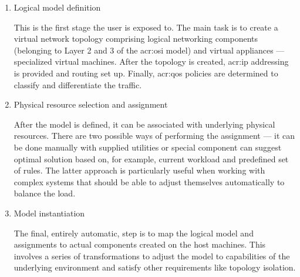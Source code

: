 \documentclass[11pt,openany]{book}
\begin{document}
          \begin{enumerate}

            \item Logical model definition

              This is the first stage the user is exposed to. The main task is to create a virtual network topology
              comprising logical networking components (belonging to Layer 2 and 3 of the \gls{acr:osi} model) and
              virtual appliances --- specialized virtual machines. After the topology is created, \gls{acr:ip}
              addressing is provided and routing set up. Finally, \gls{acr:qos} policies are determined to classify and
              differentiate the traffic.

            \item Physical resource selection and assignment

              After the model is defined, it can be associated with underlying physical resources. There are two
              possible ways of performing the assignment --- it can be done manually with supplied utilities or special
              component can suggest optimal solution based on, for example, current workload and predefined set of
              rules. The latter approach is particularly useful when working with complex systems that should be able to
              adjust themselves automatically to balance the load.

            \item Model instantiation

              The final, entirely automatic, step is to map the logical model and assignments to actual components
              created on the host machines. This involves a series of transformations to adjust the model to
              capabilities of the underlying environment and satisfy other requirements like topology isolation.
                  
          \end{enumerate}
\end{document}
